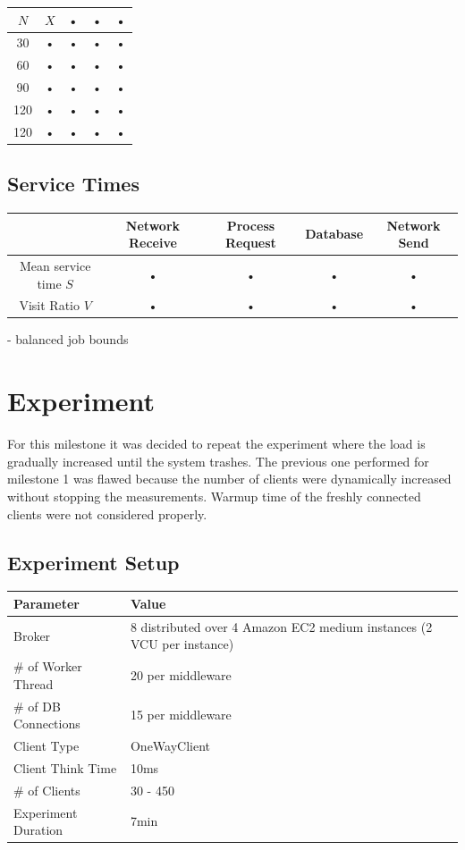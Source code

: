 \documentclass[a4paper]{article}
\begin{document}
\begin{tabular}{|c|c|c|c|c|}
\hline 
$N$ & $X$ & • & • & • \\ 
\hline 
30 & • & • & • & • \\ 
\hline 
60 & • & • & • & • \\ 
\hline 
90 & • & • & • & • \\ 
\hline 
120 & • & • & • & • \\ 
\hline 
120 & • & • & • & • \\ 
\hline 
\end{tabular} 

\subsection{Service Times}

\begin{tabular}{|c|c|c|c|c|}
\hline 
  & Network Receive & Process Request & Database & Network Send \\ 
\hline 
Mean service time $S$ & • & • & • & • \\ 
\hline 
Visit Ratio $V$ & • & • & • & • \\ 

\hline 
\end{tabular} 


- balanced job bounds

\section{Experiment}
\label{sec:experiment}
For this milestone it was decided to repeat the experiment where the load is gradually increased until the system trashes. The previous one performed for milestone 1 was flawed because the number of clients were dynamically increased without stopping the measurements. Warmup time of the freshly connected clients were not considered properly.

\subsection{Experiment Setup}

\begin{tabular}{|l|l|}
\hline 
\textbf{Parameter} & \textbf{Value} \\ 
\hline 
Broker & 8 distributed over 4 Amazon EC2 medium  instances (2 VCU per instance)\\ 
\hline 
\# of Worker Thread & 20 per middleware \\
\hline 
\# of DB Connections & 15 per middleware \\
\hline 
Client Type & OneWayClient \\ 
\hline 
Client Think Time & 10ms \\ 
\hline 
\# of Clients & 30 - 450 \\ 
\hline 
Experiment Duration & 7min \\ 
\hline 
\end{tabular} 
\end{document}
